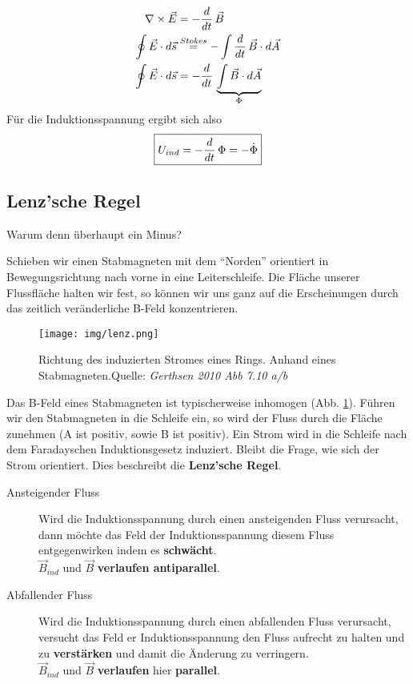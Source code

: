 \begin{align} \label{eqn:InduktionsspannungHerleitung}
\nabla \times \vec{E} &= - \frac{d }{dt} \, \vec{B} \\
\oint \vec{E} \cdot d\vec{s} &\overset{Stokes}{=} - \int \frac{d }{dt} \, \vec{B} \cdot d\vec{A} \\
\oint \vec{E} \cdot d\vec{s} &= - \frac{d }{dt} \, {} \underbrace{\int \vec{B} \cdot d\vec{A}}_{\Phi} 
\end{align} Für die Induktionsspannung ergibt sich also
\begin{align} \label{eqn:Induktionsspannung}
\boxed{U_{ind} = - \frac{d }{dt} \,  \Phi =  -\dot{\Phi}}
\end{align}

\subsection{Lenz'sche Regel}
Warum denn überhaupt ein Minus? \par 
Schieben wir einen Stabmagneten mit dem "`Norden"' orientiert in Bewegungsrichtung nach vorne in eine Leiterschleife. Die Fläche unserer Flussfläche halten wir fest, so können wir uns ganz auf die Erscheinungen durch das zeitlich veränderliche B-Feld konzentrieren.

\begin{figure}[htbp]\begin{center}
\texttt{[image: img/lenz.png]}\end{center}
\caption{Richtung des induzierten Stromes eines Rings. Anhand eines Stabmagneten.Quelle: \textit{Gerthsen 2010 Abb 7.10 a/b}}
\label{pic:Lenz}
\end{figure}

Das B-Feld eines Stabmagneten ist typischerweise inhomogen (Abb. \ref{pic:Lenz}).
Führen wir den Stabmagneten in die Schleife ein, so wird der Fluss durch die Fläche zunehmen (A ist positiv, sowie B ist positiv). Ein Strom wird in die Schleife nach dem Faradayschen Induktionsgesetz induziert.
Bleibt die Frage, wie sich der Strom orientiert. Dies beschreibt die \textbf{Lenz'sche Regel}. \par




\begin{description}
\item[Ansteigender Fluss]Wird die Induktionsspannung durch einen ansteigenden Fluss verursacht, dann möchte das Feld der Induktionsspannung diesem Fluss entgegenwirken indem es \textbf{schwächt}.\\
$\vec{B}_{ind}$ und $\vec{B}$ \textbf{verlaufen antiparallel}.
\item[Abfallender Fluss]Wird die Induktionsspannung durch einen abfallenden Fluss verursacht, versucht das Feld er Induktionsspannung den Fluss aufrecht zu halten und zu \textbf{verstärken} und damit die Änderung zu verringern.\\
$\vec{B}_{ind}$ und $\vec{B}$ \textbf{verlaufen} hier \textbf{parallel}.
\end{description}


